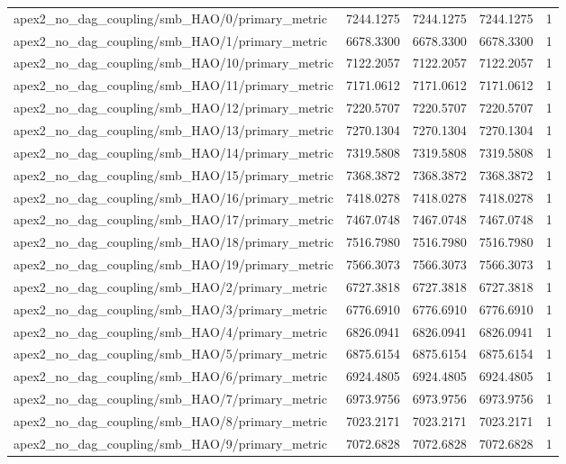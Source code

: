 \begin{table}[h]
\begin{tabular}{lrrrr}
apex2_no_dag_coupling/smb_HAO/0/primary_metric & 7244.1275 & 7244.1275 & 7244.1275 & 1 \\
apex2_no_dag_coupling/smb_HAO/1/primary_metric & 6678.3300 & 6678.3300 & 6678.3300 & 1 \\
apex2_no_dag_coupling/smb_HAO/10/primary_metric & 7122.2057 & 7122.2057 & 7122.2057 & 1 \\
apex2_no_dag_coupling/smb_HAO/11/primary_metric & 7171.0612 & 7171.0612 & 7171.0612 & 1 \\
apex2_no_dag_coupling/smb_HAO/12/primary_metric & 7220.5707 & 7220.5707 & 7220.5707 & 1 \\
apex2_no_dag_coupling/smb_HAO/13/primary_metric & 7270.1304 & 7270.1304 & 7270.1304 & 1 \\
apex2_no_dag_coupling/smb_HAO/14/primary_metric & 7319.5808 & 7319.5808 & 7319.5808 & 1 \\
apex2_no_dag_coupling/smb_HAO/15/primary_metric & 7368.3872 & 7368.3872 & 7368.3872 & 1 \\
apex2_no_dag_coupling/smb_HAO/16/primary_metric & 7418.0278 & 7418.0278 & 7418.0278 & 1 \\
apex2_no_dag_coupling/smb_HAO/17/primary_metric & 7467.0748 & 7467.0748 & 7467.0748 & 1 \\
apex2_no_dag_coupling/smb_HAO/18/primary_metric & 7516.7980 & 7516.7980 & 7516.7980 & 1 \\
apex2_no_dag_coupling/smb_HAO/19/primary_metric & 7566.3073 & 7566.3073 & 7566.3073 & 1 \\
apex2_no_dag_coupling/smb_HAO/2/primary_metric & 6727.3818 & 6727.3818 & 6727.3818 & 1 \\
apex2_no_dag_coupling/smb_HAO/3/primary_metric & 6776.6910 & 6776.6910 & 6776.6910 & 1 \\
apex2_no_dag_coupling/smb_HAO/4/primary_metric & 6826.0941 & 6826.0941 & 6826.0941 & 1 \\
apex2_no_dag_coupling/smb_HAO/5/primary_metric & 6875.6154 & 6875.6154 & 6875.6154 & 1 \\
apex2_no_dag_coupling/smb_HAO/6/primary_metric & 6924.4805 & 6924.4805 & 6924.4805 & 1 \\
apex2_no_dag_coupling/smb_HAO/7/primary_metric & 6973.9756 & 6973.9756 & 6973.9756 & 1 \\
apex2_no_dag_coupling/smb_HAO/8/primary_metric & 7023.2171 & 7023.2171 & 7023.2171 & 1 \\
apex2_no_dag_coupling/smb_HAO/9/primary_metric & 7072.6828 & 7072.6828 & 7072.6828 & 1 \\

\end{tabular}
\end{table}
